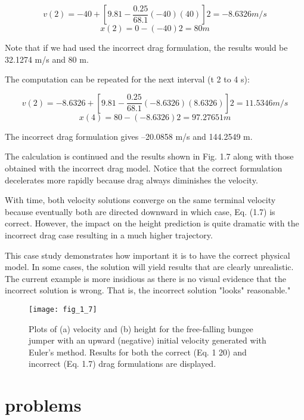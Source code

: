 \documentclass[../main.tex]{subfiles}
\begin{document}
$$v(2)= -40 + \left[ 9.81 - \dfrac{0.25}{68.1}(-40)(40) \right]2= -8.6326 m/s $$
$$x(2)=0 - (-40)2=80 m$$

 Note that if we had used the incorrect drag formulation, the results would be 32.1274 m/s
and 80 m. 

The computation can be repeated for the next interval (t  2 to 4 s):

$$v(2)= -8.6326 + \left[ 9.81 - \dfrac{0.25}{68.1}(-8.6326)(8.6326) \right]2= 11.5346 m/s $$
$$x(4) =80 -(-8.6326)2=97.27651 m $$


The incorrect drag formulation gives –20.0858 m/s and 144.2549 m.


The calculation is continued and the results shown in Fig. 1.7 along with those
obtained with the incorrect drag model. Notice that the correct formulation decelerates
more rapidly because drag always diminishes the velocity.


With time, both velocity solutions converge on the same terminal velocity because
eventually both are directed downward in which case, Eq. (1.7) is correct. However, the
impact on the height prediction is quite dramatic with the incorrect drag case resulting in a
much higher trajectory.


This case study demonstrates how important it is to have the correct physical model.
In some cases, the solution will yield results that are clearly unrealistic. The current example is more insidious as there is no visual evidence that the incorrect solution is wrong. That
is, the incorrect solution "looks" reasonable."

\begin{figure}[H]
	\centering
	\texttt{[image: fig\_1\_7]}
   \caption{\textsf{Plots of (a) velocity and (b) height for the free-falling bungee jumper with an upward (negative)
   initial velocity generated with Euler's method. Results for both the correct (Eq. 1 20) and incorrect
   (Eq. 1.7) drag formulations are displayed.}}
   \label{fig_1_7}
\end{figure}

\section*{problems}
\end{document}
